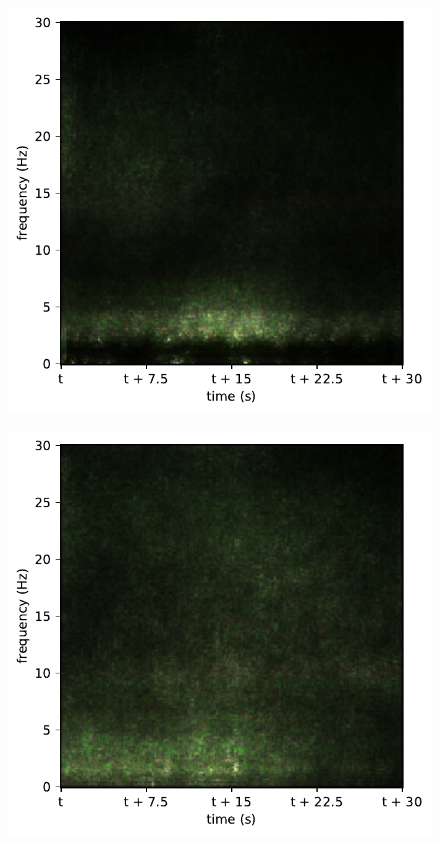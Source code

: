\begin{subfigure}{.16\textwidth}
  \centering
  \includegraphics[width=1\linewidth]{./../Article/pics/class_rnn_4}
  \caption{}
  \label{fig_1_35}
\end{subfigure}%
\begin{subfigure}{.16\textwidth}
  \centering
  \includegraphics[width=1\linewidth]{./../Article/pics/class_rnn_5}
  \caption{}
  \label{fig_1_36}
\end{subfigure}

